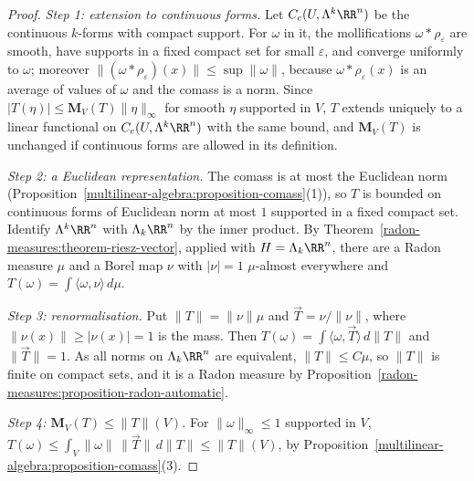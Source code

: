 \begin{proof}
\emph{Step 1: extension to continuous forms.} Let $C_c(U, \Lambda^k\RR^n)$ be the continuous $k$-forms with compact support. For $\omega$ in it, the mollifications $\omega * \rho_\varepsilon$ are smooth, have supports
in a fixed compact set for small $\varepsilon$, and converge uniformly to $\omega$; moreover $\|(\omega * \rho_\varepsilon)(x)\| \leq \sup\|\omega\|$, because $\omega * \rho_\varepsilon(x)$ is an average of values of $\omega$ and the
comass is a norm. Since $|T(\eta)| \leq \mathbf{M}_V(T)\|\eta\|_\infty$ for smooth $\eta$ supported in $V$, $T$ extends uniquely to a linear functional on $C_c(U, \Lambda^k\RR^n)$ with the same bound, and
$\mathbf{M}_V(T)$ is unchanged if continuous forms are allowed in its definition.

\emph{Step 2: a Euclidean representation.} The comass is at most the Euclidean norm (Proposition~\ref{multilinear-algebra:proposition-comass}(1)), so $T$ is bounded on continuous forms of Euclidean norm at
most $1$ supported in a fixed compact set. Identify $\Lambda^k\RR^n$ with $\Lambda_k\RR^n$ by the inner product. By Theorem~\ref{radon-measures:theorem-riesz-vector}, applied with $H = \Lambda_k\RR^n$, there are a Radon
measure $\mu$ and a Borel map $\nu$ with $|\nu| = 1$ $\mu$-almost everywhere and $T(\omega) = \int\langle\omega, \nu\rangle\,d\mu$.

\emph{Step 3: renormalisation.} Put $\|T\| = \|\nu\|\mu$ and $\vec{T} = \nu/\|\nu\|$, where $\|\nu(x)\| \geq |\nu(x)| = 1$ is the mass. Then $T(\omega) = \int\langle\omega, \vec{T}\rangle\,d\|T\|$ and $\|\vec{T}\| = 1$. As all norms on
$\Lambda_k\RR^n$ are equivalent, $\|T\| \leq C\mu$, so $\|T\|$ is finite on compact sets, and it is a Radon measure by Proposition~\ref{radon-measures:proposition-radon-automatic}.

\emph{Step 4: $\mathbf{M}_V(T) \leq \|T\|(V)$.} For $\|\omega\|_\infty \leq 1$ supported in $V$, $T(\omega) \leq \int_V\|\omega\|\,\|\vec{T}\|\,d\|T\| \leq \|T\|(V)$, by
Proposition~\ref{multilinear-algebra:proposition-comass}(3).


\end{proof}
